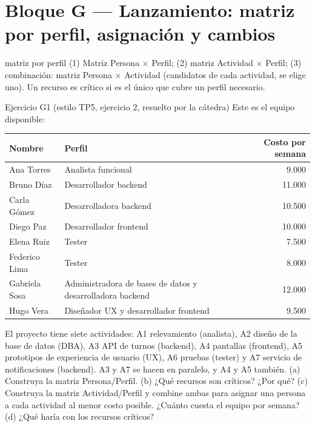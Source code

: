 \documentclass[11pt,a4paper]{article}
\begin{document}
\section{Bloque G --- Lanzamiento: matriz por perfil, asignación y cambios}
\begin{plantilla}{matriz por perfil}
(1) Matriz Persona $\times$ Perfil; (2) matriz Actividad $\times$ Perfil; (3) combinación: matriz Persona $\times$
Actividad (candidatos de cada actividad, se elige uno). Un recurso es crítico si es el único que cubre un perfil
necesario.
\end{plantilla}
\begin{enunciado}{Ejercicio G1 (estilo TP5, ejercicio 2, resuelto por la cátedra)}
Este es el equipo disponible:
\begin{center}\small
\begin{tabular}{llr}
\toprule
Nombre & Perfil & Costo por semana\\
\midrule
Ana Torres & Analista funcional & 9.000\\
Bruno Díaz & Desarrollador backend & 11.000\\
Carla Gómez & Desarrolladora backend & 10.500\\
Diego Paz & Desarrollador frontend & 10.000\\
Elena Ruiz & Tester & 7.500\\
Federico Lima & Tester & 8.000\\
Gabriela Sosa & Administradora de bases de datos y desarrolladora backend & 12.000\\
Hugo Vera & Diseñador UX y desarrollador frontend & 9.500\\
\bottomrule
\end{tabular}
\end{center}
El proyecto tiene siete actividades: A1 relevamiento (analista), A2 diseño de la base de datos (DBA), A3 API de
turnos (backend), A4 pantallas (frontend), A5 prototipos de experiencia de usuario (UX), A6 pruebas (tester) y A7
servicio de notificaciones (backend). A3 y A7 se hacen en paralelo, y A4 y A5 también.
(a) Construya la matriz Persona/Perfil. (b) ¿Qué recursos son críticos? ¿Por qué? (c) Construya la matriz
Actividad/Perfil y combine ambas para asignar una persona a cada actividad al menor costo posible. ¿Cuánto cuesta
el equipo por semana? (d) ¿Qué haría con los recursos críticos?
\end{enunciado}
\end{document}
